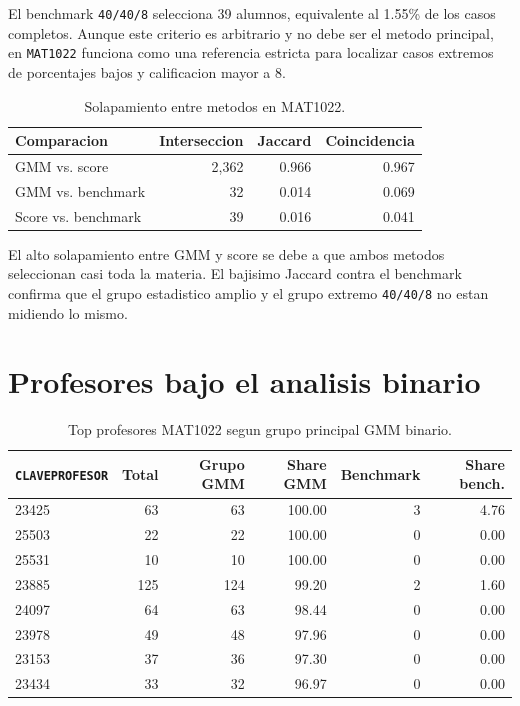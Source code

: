 \documentclass[11pt,letterpaper]{article}
\newcommand{\code}[1]{\texttt{#1}}
\begin{document}
El benchmark \code{40/40/8} selecciona 39 alumnos, equivalente al 1.55\% de los casos completos. Aunque este criterio es arbitrario y no debe ser el metodo principal, en \code{MAT1022} funciona como una referencia estricta para localizar casos extremos de porcentajes bajos y calificacion mayor a 8.

\begin{table}[H]
\centering
\caption{Solapamiento entre metodos en MAT1022.}
\begin{tabular}{lrrr}
\toprule
Comparacion & Interseccion & Jaccard & Coincidencia \\
\midrule
GMM vs. score & 2,362 & 0.966 & 0.967 \\
GMM vs. benchmark & 32 & 0.014 & 0.069 \\
Score vs. benchmark & 39 & 0.016 & 0.041 \\
\bottomrule
\end{tabular}
\end{table}

El alto solapamiento entre GMM y score se debe a que ambos metodos seleccionan casi toda la materia. El bajisimo Jaccard contra el benchmark confirma que el grupo estadistico amplio y el grupo extremo \code{40/40/8} no estan midiendo lo mismo.

\section{Profesores bajo el analisis binario}

\begin{table}[H]
\centering
\caption{Top profesores MAT1022 segun grupo principal GMM binario.}
\begin{tabular}{lrrrrr}
\toprule
\code{CLAVEPROFESOR} & Total & Grupo GMM & Share GMM & Benchmark & Share bench. \\
\midrule
23425 & 63 & 63 & 100.00 & 3 & 4.76 \\
25503 & 22 & 22 & 100.00 & 0 & 0.00 \\
25531 & 10 & 10 & 100.00 & 0 & 0.00 \\
23885 & 125 & 124 & 99.20 & 2 & 1.60 \\
24097 & 64 & 63 & 98.44 & 0 & 0.00 \\
23978 & 49 & 48 & 97.96 & 0 & 0.00 \\
23153 & 37 & 36 & 97.30 & 0 & 0.00 \\
23434 & 33 & 32 & 96.97 & 0 & 0.00 \\
\bottomrule
\end{tabular}
\end{table}
\end{document}
